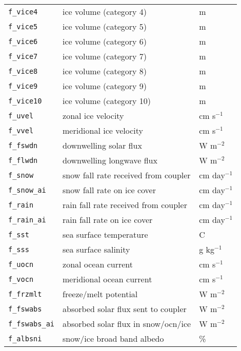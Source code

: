 \begin{center}
\begin{supertabular}{lll}
\texttt{f\_vice4}   & ice volume (category 4)              & m            \\
\texttt{f\_vice5}   & ice volume (category 5)              & m            \\
\texttt{f\_vice6}   & ice volume (category 6)              & m            \\
\texttt{f\_vice7}   & ice volume (category 7)              & m            \\
\texttt{f\_vice8}   & ice volume (category 8)              & m            \\
\texttt{f\_vice9}   & ice volume (category 9)              & m            \\
\texttt{f\_vice10}  & ice volume (category 10)             & m            \\
\texttt{f\_uvel}    & zonal ice velocity                   & cm s$^{-1}$    \\
\texttt{f\_vvel}    & meridional ice velocity              & cm s$^{-1}$    \\
\texttt{f\_fswdn}   & downwelling solar flux               & W m$^{-2}$     \\
\texttt{f\_flwdn}   & downwelling longwave flux            & W m$^{-2}$    \\
\texttt{f\_snow}    & snow fall rate received from coupler & cm day$^{-1}$ \\
\texttt{f\_snow\_ai} & snow fall rate on ice cover       & cm day$^{-1}$ \\
\texttt{f\_rain}    & rain fall rate received from coupler & cm day$^{-1}$ \\
\texttt{f\_rain\_ai} & rain fall rate on ice cover       & cm day$^{-1}$ \\
\texttt{f\_sst}     & sea surface temperature              & C             \\
\texttt{f\_sss}     & sea surface salinity                 & g kg$^{-1}$   \\
\texttt{f\_uocn}    & zonal ocean current                  & cm s$^{-1}$   \\
\texttt{f\_vocn}    & meridional ocean current             & cm s$^{-1}$   \\
\texttt{f\_frzmlt}  & freeze/melt potential                & W m$^{-2}$   \\
\texttt{f\_fswabs}  & absorbed solar flux sent to coupler  & W m$^{-2}$     \\
\texttt{f\_fswabs\_ai} & absorbed solar flux in snow/ocn/ice & W m$^{-2}$     \\
\texttt{f\_albsni}  & snow/ice broad band albedo           & \%             \\

\end{supertabular}
\end{center}
